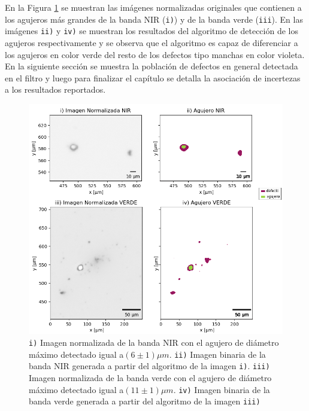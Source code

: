 En la Figura \ref{fig:aggjj} se muestran las imágenes normalizadas originales que contienen a los agujeros más grandes de la banda NIR (\texttt{i)}) y de la banda verde (\texttt{iii}). En las imágenes \texttt{ii)} y \texttt{iv)} se muestran los resultados del algoritmo de detección de los agujeros respectivamente y se observa que el algoritmo es capaz de diferenciar a los agujeros en color verde del resto de los defectos tipo manchas en color violeta.
En la siguiente sección se muestra la población de defectos en general detectada en el filtro y luego para finalizar el capítulo se detalla la asociación de incertezas a los resultados reportados.
 \begin{figure}
\centering
\includegraphics[scale=1.0]{Figs/cuantificaciondefectos/agujerross.png}
\caption{\texttt{i)} Imagen normalizada de la banda NIR con el agujero de diámetro máximo detectado igual a$(6 \pm 1) \mu m$. \texttt{ii)} Imagen binaria de la banda NIR generada a partir del algoritmo de la imagen \texttt{i)}. \texttt{iii)} Imagen normalizada de la banda verde con el agujero de diámetro máximo detectado igual a$(11 \pm 1) \mu m$. \texttt{iv)} Imagen binaria de la banda verde generada a partir del algoritmo de la imagen \texttt{iii)}}
\label{fig:aggjj}
\end{figure}



\singlespacing

